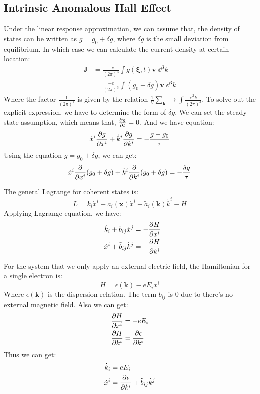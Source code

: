 \documentclass[../main.tex]{subfiles}
\begin{document}
\subsection{Intrinsic Anomalous Hall Effect}
Under the linear response approximation, we can assume that, the density of states can be written as $g = g_0 + \delta g$, where $\delta g$ is the small deviation from equilibrium. In which case we can calculate the current density at certain location:
\begin{align}
    \bm{J} &= \frac{-e}{(2\pi)^3}\int g(\bm{\xi}, t) \bm{v}\; \dd^3{k} \nonumber\\
    &= \frac{-e}{(2\pi)^3} \int (g_0 + \delta g) \bm{v} \;\dd^3{k}
\end{align}
Where the factor $\frac{1}{(2\pi)^3}$ is given by the relation $\frac{1}{V} \sum_{\bm{k}} \longrightarrow \int \frac{\dd^3{k}}{(2\pi)^3}$. To solve out the explicit expression, we have to determine the form of $\delta g$. We can set the steady state assumption, which means that, $\pdv{g}{t} = 0$. And we have equation:
\begin{equation}
    \dot{x}^i\pdv{g}{x^i} +  \dot{k}^i\pdv{g}{k^i} = - \frac{g - g_0}{\tau}
\end{equation}
Using the equation $g = g_0 + \delta g$, we can get:
\begin{equation}
    \dot{x}^i\pdv{x^i}(g_0 + \delta g) +  \dot{k}^i\pdv{k^i}(g_0 + \delta g) = - \frac{\delta g}{\tau}
\end{equation}

The general Lagrange for coherent states is:
\begin{equation}
    L = k_i\dot{x}^i - a_i(\bm{x})\dot{x}^i - \tilde{a}_i(\bm{k})\dot{k}^i - H
\end{equation}
Applying Lagrange equation, we have:
\begin{align}
    \dot{k}_i + b_{ij}\dot{x}^j &= -\pdv{H}{x^i}\\
    -\dot{x}^i + \tilde{b}_{ij} \dot{k}^j &= -\pdv{H}{k^i}
\end{align}

For the system that we only apply an external electric field, the Hamiltonian for a single electron is:
\begin{equation}
    H = \epsilon(\bm{k}) - eE_ix^i
\end{equation}
Where $\epsilon(\bm{k})$ is the dispersion relation. The term $b_{ij}$ is $0$ due to there's no external magnetic field. Also we can get:
\begin{align}
    \pdv{H}{x^i} &= -e E_i\\
    \pdv{H}{k^i} &= \pdv{\epsilon}{k^i}
\end{align}
Thus we can get:
\begin{align}
    \dot{k}_i &= eE_i \\
    \dot{x}^i &= \pdv{\epsilon}{k^i} + \tilde{b}_{ij} \dot{k}^j
\end{align}
\end{document}

